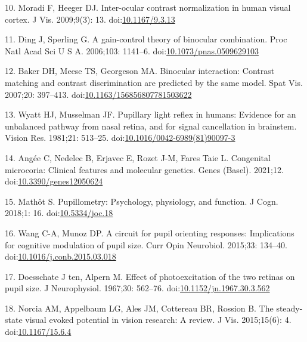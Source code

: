 \documentclass[
]{article}
\begin{document}
\leavevmode\hypertarget{ref-Moradi2009}{}%
10. Moradi F, Heeger DJ. Inter-ocular contrast normalization in human visual cortex. J Vis. 2009;9(3): 13. doi:\href{https://doi.org/10.1167/9.3.13}{10.1167/9.3.13}

\leavevmode\hypertarget{ref-Ding2006}{}%
11. Ding J, Sperling G. A gain-control theory of binocular combination. Proc Natl Acad Sci U S A. 2006;103: 1141--6. doi:\href{https://doi.org/10.1073/pnas.0509629103}{10.1073/pnas.0509629103}

\leavevmode\hypertarget{ref-Baker2007}{}%
12. Baker DH, Meese TS, Georgeson MA. Binocular interaction: Contrast matching and contrast discrimination are predicted by the same model. Spat Vis. 2007;20: 397--413. doi:\href{https://doi.org/10.1163/156856807781503622}{10.1163/156856807781503622}

\leavevmode\hypertarget{ref-Wyatt1981}{}%
13. Wyatt HJ, Musselman JF. Pupillary light reflex in humans: Evidence for an unbalanced pathway from nasal retina, and for signal cancellation in brainstem. Vision Res. 1981;21: 513--25. doi:\href{https://doi.org/10.1016/0042-6989(81)90097-3}{10.1016/0042-6989(81)90097-3}

\leavevmode\hypertarget{ref-Angee2021}{}%
14. Angée C, Nedelec B, Erjavec E, Rozet J-M, Fares Taie L. Congenital microcoria: Clinical features and molecular genetics. Genes (Basel). 2021;12. doi:\href{https://doi.org/10.3390/genes12050624}{10.3390/genes12050624}

\leavevmode\hypertarget{ref-Mathot2018}{}%
15. Mathôt S. Pupillometry: Psychology, physiology, and function. J Cogn. 2018;1: 16. doi:\href{https://doi.org/10.5334/joc.18}{10.5334/joc.18}

\leavevmode\hypertarget{ref-Wang2015}{}%
16. Wang C-A, Munoz DP. A circuit for pupil orienting responses: Implications for cognitive modulation of pupil size. Curr Opin Neurobiol. 2015;33: 134--40. doi:\href{https://doi.org/10.1016/j.conb.2015.03.018}{10.1016/j.conb.2015.03.018}

\leavevmode\hypertarget{ref-Doesschate1967}{}%
17. Doesschate J ten, Alpern M. Effect of photoexcitation of the two retinas on pupil size. J Neurophysiol. 1967;30: 562--76. doi:\href{https://doi.org/10.1152/jn.1967.30.3.562}{10.1152/jn.1967.30.3.562}

\leavevmode\hypertarget{ref-Norcia2015}{}%
18. Norcia AM, Appelbaum LG, Ales JM, Cottereau BR, Rossion B. The steady-state visual evoked potential in vision research: A review. J Vis. 2015;15(6): 4. doi:\href{https://doi.org/10.1167/15.6.4}{10.1167/15.6.4}
\end{document}
